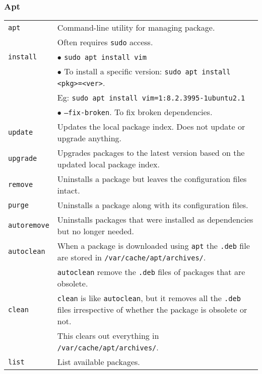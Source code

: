 \subsubsection*{Apt}

\begin{tabularx}{\linewidth}{lX}
    \texttt{apt}                & Command-line utility for managing package.\\
                                & Often requires \texttt{sudo} access.\\
    \texttt{install}            & $\bullet$ \texttt{sudo apt install vim}\\
                                & $\bullet$ To install a specific version: \texttt{sudo apt install <pkg>=<ver>}.\\
                                & Eg: \texttt{sudo apt install vim=1:8.2.3995-1ubuntu2.1}\\
                                & $\bullet$ \texttt{--fix-broken}. To fix broken dependencies.\\
    \texttt{update}             & Updates the local package index. Does not update or upgrade anything.\\
    \texttt{upgrade}            & Upgrades packages to the latest version based on the updated 
                                  local package index.\\
    \texttt{remove}             & Uninstalls a package but leaves the configuration files intact.\\
    \texttt{purge}              & Uninstalls a package along with its configuration files.\\
    \texttt{autoremove}         & Uninstalls packages that were installed as dependencies but no longer needed.\\
    \texttt{autoclean}          & When a package is downloaded using \texttt{apt} the \texttt{.deb} file are stored in \texttt{/var/cache/apt/archives/}.\\
                                & \texttt{autoclean} remove the \texttt{.deb} files of packages that are obsolete.\\
    \texttt{clean}              & \texttt{clean} is like \texttt{autoclean}, but it removes all the \texttt{.deb} files irrespective of whether the package is obsolete or not.\\
                                & This clears out everything in \texttt{/var/cache/apt/archives/}.\\
    \texttt{list}               & List available packages.\\

\end{tabularx}
